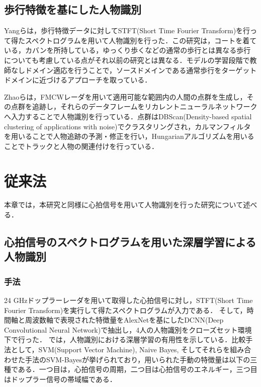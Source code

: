 
\section{歩行特徴を基にした人物識別}
Yangらは，歩行特徴データに対してSTFT(Short Time Fourier Transform)を行って得たスペクトログラムを用いて人物識別を行った\cite{paper:unsupervised}．この研究は，コートを着ている，カバンを所持している，ゆっくり歩くなどの通常の歩行とは異なる歩行についても考慮している点がそれ以前の研究とは異なる．モデルの学習段階で教師なしドメイン適応を行うことで，ソースドメインである通常歩行をターゲットドメインに近づけるアプローチを取っている．

Zhaoらは，FMCWレーダを用いて適用可能な範囲内の人間の点群を生成し，その点群を追跡し，それらのデータフレームをリカレントニューラルネットワークへ入力することで人物識別を行っている\cite{paper:human_track}．点群はDBScan(Density-based spatial clustering of applications with noise)\cite{paper:dbscan}でクラスタリングされ，カルマンフィルタ\cite{paper:kalman}を用いることで人物追跡の予測・修正を行い，Hungarianアルゴリズム\cite{paper:Hungarian}を用いることでトラックと人物の関連付けを行っている．

\chapter{従来法}
本章では，本研究と同様に心拍信号を用いて人物識別を行った研究について述べる．

\section{心拍信号のスペクトログラムを用いた深層学習による人物識別\cite{paper:HeartID}}
\subsection{手法}
24 GHzドップラーレーダを用いて取得した心拍信号に対し，STFT(Short Time Fourier Transform)を実行して得たスペクトログラムが入力である．
そして，時間軸と周波数軸で表現された特徴量をAlexNetを基にしたDCNN(Deep Convolutional Neural Network)で抽出し，4人の人物識別をクローズセット環境下で行った．
\cite{paper:HeartID}では，人物識別における深層学習の有用性を示している．比較手法として，SVM(Support Vector Machine), Naive Bayes, そしてそれらを組み合わせた手法のSVM-Bayesが挙げられており，用いられた手動の特徴量は以下の三種である．一つ目は，心拍信号の周期，二つ目は心拍信号のエネルギー，三つ目はドップラー信号の帯域幅である．

